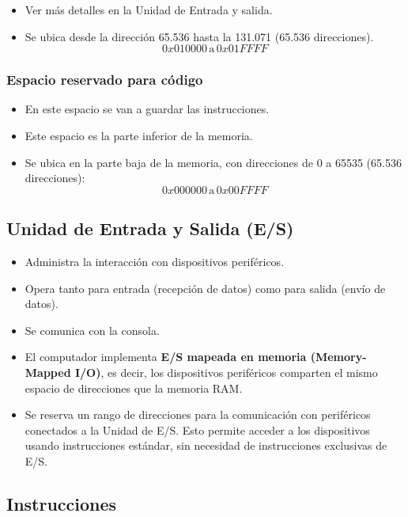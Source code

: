 \documentclass{article}
\begin{document}
\begin{itemize}
  \item Ver más detalles en la Unidad de Entrada y salida.
  \item Se ubica desde la dirección 65.536 hasta la 131.071 (65.536 direcciones).
        \[
          0x010000 \, \text{a} \, 0x01FFFF
        \]
\end{itemize}

\subsubsection{Espacio reservado para código}

\begin{itemize}
  \item En este espacio se van a guardar las instrucciones.
  \item Este espacio es la parte inferior de la memoria.
  \item Se ubica en la parte baja de la memoria, con direcciones de 0 a 65535 (65.536 direcciones):
        \[
          0x000000 \, \text{a} \, 0x00FFFF
        \]
\end{itemize}


\subsection{Unidad de Entrada y Salida (E/S)}

\begin{itemize}
  \item Administra la interacción con dispositivos periféricos.
  \item Opera tanto para entrada (recepción de datos) como para salida (envío de datos).
  \item Se comunica con la consola.
  \item El computador implementa \textbf{E/S mapeada en memoria (Memory-Mapped I/O)}, es decir, los dispositivos periféricos comparten el mismo espacio de direcciones que la memoria RAM.
  \item Se reserva un rango de direcciones para la comunicación con periféricos conectados a la Unidad de E/S. Esto permite acceder a los dispositivos usando instrucciones estándar, sin necesidad de instrucciones exclusivas de E/S.
\end{itemize}


\subsection{Instrucciones}
\end{document}
